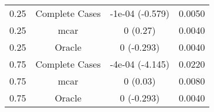 \begin{table}[ht]
\centering
\begin{tabular}{cccc}
  \hline
  \hline
0.25 & Complete Cases & -1e-04 (-0.579) & 0.0050 \\ 
  0.25 & mcar & 0 (0.27) & 0.0040 \\ 
  0.25 & Oracle & 0 (-0.293) & 0.0040 \\ 
  0.75 & Complete Cases & -4e-04 (-4.145) & 0.0220 \\ 
  0.75 & mcar & 0 (0.03) & 0.0080 \\ 
  0.75 & Oracle & 0 (-0.293) & 0.0040 \\ 
   \hline
\end{tabular}
\end{table}
